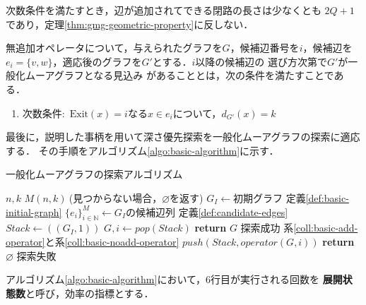 次数条件を満たすとき，辺が追加されてできる閉路の長さは少なくとも
$2Q+1$であり，定理\ref{thm:gmg-geometric-property}に反しない．

\begin{corollary-without-proof}\rm
  \label{coll:basic-noadd-operator}
  無追加オペレータについて，与えられたグラフを$G$，候補辺番号を$i$，候補辺を
  $e_i=\{v,w\}$，適応後のグラフを$G'$とする．$i$以降の候補辺の
  選び方次第で$G'$が一般化ムーアグラフとなる見込み
  があることとは，次の条件を満たすことである．
  \begin{enumerate}
  \item 次数条件:\ $\text{Exit}(x)=i$なる$x\in e_i$について，$d_{G'}(x)=k$
  \end{enumerate}
\end{corollary-without-proof}

最後に，説明した事柄を用いて深さ優先探索を一般化ムーアグラフの探索に適応する．
その手順をアルゴリズム\ref{algo:basic-algorithm}に示す．
\begin{algorithm}[H]
  \caption{一般化ムーアグラフの探索アルゴリズム}
  \label{algo:basic-algorithm}
  \begin{algorithmic}[1]
    \Require $n,k$
    \Ensure $M(n,k)\:$(見つからない場合，$\varnothing$を返す)
    \State $G_I\gets\text{初期グラフ}$
    \Comment 定義\ref{def:basic-initial-graph}
    \State $\{e_i\}_{i\in\mathbb{N}}^M\gets G_I\text{の候補辺列}$
    \Comment 定義\ref{def:candidate-edges}
    \State $Stack\gets((G_I,1))$
    \State $G,i\gets pop(Stack)$
    \State \textbf{return} $G$
    \Comment 探索成功
    \EndIf
    \Comment 系\ref{coll:basic-add-operator}と系\ref{coll:basic-noadd-operator}
    \State $push(Stack,operator(G,i))$
    \EndIf
    \EndFor
    \EndWhile
    \State \textbf{return} $\varnothing$
    \Comment 探索失敗
    \EndProcedure
  \end{algorithmic}
\end{algorithm}
アルゴリズム\ref{algo:basic-algorithm}において，6行目が実行される回数を
\textbf{展開状態数}と呼び，効率の指標とする．

